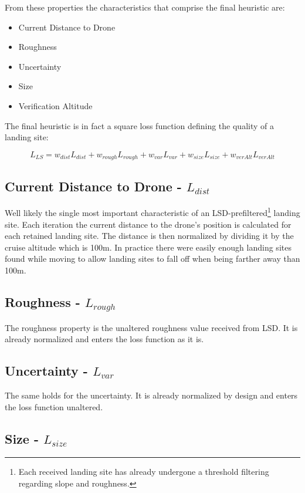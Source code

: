 From these properties the characteristics that comprise the final heuristic are:

\begin{itemize}
    \item Current Distance to Drone
    \item Roughness
    \item Uncertainty
    \item Size
    \item Verification Altitude
\end{itemize}

The final heuristic is in fact a square loss function defining the quality of a landing site:

\begin{equation}
    L_{LS} = w_{dist}L_{dist} + w_{rough}L_{rough} + w_{var}L_{var} + w_{size}L_{size} + w_{verAlt}L_{verAlt}
\end{equation}

\subsection{Current Distance to Drone - $L_{dist}$}
Well likely the single most important characteristic of an LSD-prefiltered\footnote[1]{Each received landing site has already undergone a threshold filtering regarding slope and roughness.} landing site. Each iteration the current distance to the drone's position is calculated for each retained landing site. The distance is then normalized by dividing it by the cruise altitude which is 100m. In practice there were easily enough landing sites found while moving to allow landing sites to fall off when being farther away than 100m.

\subsection{Roughness - $L_{rough}$}

The roughness property is the unaltered roughness value received from LSD. It is already normalized and enters the loss function as it is. 

\subsection{Uncertainty - $L_{var}$}

The same holds for the uncertainty. It is already normalized by design and enters the loss function unaltered.

\subsection{Size - $L_{size}$}

